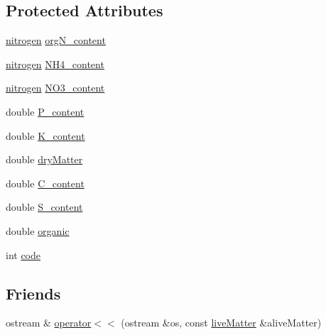 \subsection*{Protected Attributes}
\begin{DoxyCompactItemize}
\item 
\hyperlink{classnitrogen}{nitrogen} \hyperlink{classlive_matter_a7fd6353da8a485db5b95b1ccd78a5776}{orgN\_\-content}
\item 
\hyperlink{classnitrogen}{nitrogen} \hyperlink{classlive_matter_a8e7a9da472ef95f8426cab359acae69f}{NH4\_\-content}
\item 
\hyperlink{classnitrogen}{nitrogen} \hyperlink{classlive_matter_a43a0f729f017276359cbf8995a8fda66}{NO3\_\-content}
\item 
double \hyperlink{classlive_matter_a66a67e2b61774ef9e9ec3054c8687559}{P\_\-content}
\item 
double \hyperlink{classlive_matter_aff29c19f063203a2e4dffc04986adc74}{K\_\-content}
\item 
double \hyperlink{classlive_matter_a1a622bc1c2258ae716f26c9dd3bf66d1}{dryMatter}
\item 
double \hyperlink{classlive_matter_abe13a37fe5a11f5fcb286b4031c4fc87}{C\_\-content}
\item 
double \hyperlink{classlive_matter_ac4d5d679085aa89d920b2e06f2621b1f}{S\_\-content}
\item 
double \hyperlink{classlive_matter_ac8b878ebaf904e10140d75715064f757}{organic}
\item 
int \hyperlink{classlive_matter_af8311f0490e29d4a872e3bb9588099de}{code}
\end{DoxyCompactItemize}
\subsection*{Friends}
\begin{DoxyCompactItemize}
\item 
ostream \& \hyperlink{classlive_matter_a694b548b571c88f71f2c7cc75b47d0fb}{operator$<$$<$} (ostream \&os, const \hyperlink{classlive_matter}{liveMatter} \&aliveMatter)
\end{DoxyCompactItemize}


